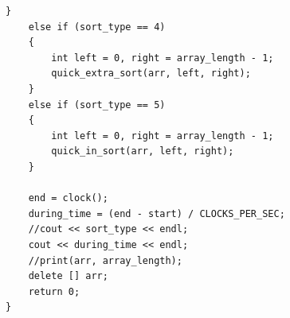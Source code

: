 \documentclass{article}
\begin{document}
\begin{lstlisting}[title=main_test, frame=shadowbox]
    }
    else if (sort_type == 4)
    {
        int left = 0, right = array_length - 1;
        quick_extra_sort(arr, left, right);
    }
    else if (sort_type == 5)
    {
        int left = 0, right = array_length - 1;
        quick_in_sort(arr, left, right);
    }

    end = clock();
    during_time = (end - start) / CLOCKS_PER_SEC;
    //cout << sort_type << endl;
    cout << during_time << endl;
    //print(arr, array_length);
    delete [] arr;
    return 0;
}
\end{lstlisting}
\end{document}

